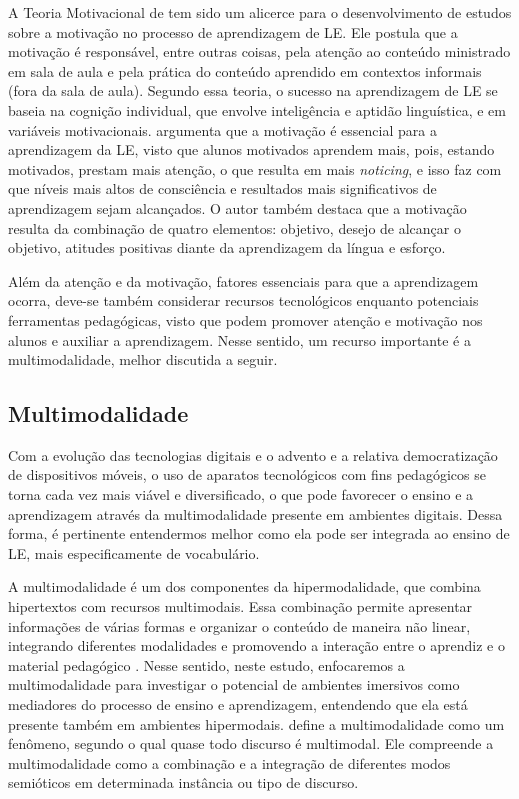 A Teoria Motivacional de \textcite{gardner1979} tem sido um alicerce para o
desenvolvimento de estudos sobre a motivação no processo de aprendizagem
de LE. Ele postula que a motivação é responsável, entre outras coisas,
pela atenção ao conteúdo ministrado em sala de aula e pela prática do
conteúdo aprendido em contextos informais (fora da sala de aula).
Segundo essa teoria, o sucesso na aprendizagem de LE se baseia na
cognição individual, que envolve inteligência e aptidão linguística, e
em variáveis motivacionais. \textcite{gardner2010} argumenta que a motivação é
essencial para a aprendizagem da LE, visto que alunos motivados aprendem
mais, pois, estando motivados, prestam mais atenção, o que resulta em
mais \emph{noticing}, e isso faz com que níveis mais altos de
consciência e resultados mais significativos de aprendizagem sejam
alcançados. O autor também destaca que a motivação resulta da combinação
de quatro elementos: objetivo, desejo de alcançar o objetivo, atitudes
positivas diante da aprendizagem da língua e esforço.

Além da atenção e da motivação, fatores essenciais para que a
aprendizagem ocorra, deve-se também considerar recursos tecnológicos
enquanto potenciais ferramentas pedagógicas, visto que podem promover
atenção e motivação nos alunos e auxiliar a aprendizagem. Nesse sentido,
um recurso importante é a multimodalidade, melhor discutida a seguir.

\subsection{Multimodalidade}\label{sec-multimodalidade}

Com a evolução das tecnologias digitais e o advento e a relativa
democratização de dispositivos móveis, o uso de aparatos tecnológicos
com fins pedagógicos se torna cada vez mais viável e diversificado, o
que pode favorecer o ensino e a aprendizagem através da multimodalidade
presente em ambientes digitais. Dessa forma, é pertinente entendermos
melhor como ela pode ser integrada ao ensino de LE, mais especificamente
de vocabulário.

A multimodalidade é um dos componentes da hipermodalidade, que combina
hipertextos com recursos multimodais. Essa combinação permite apresentar
informações de várias formas e organizar o conteúdo de maneira não
linear, integrando diferentes modalidades e promovendo a interação entre
o aprendiz e o material pedagógico \textcite{braga2004}. Nesse sentido, neste
estudo, enfocaremos a multimodalidade para investigar o potencial de
ambientes imersivos como mediadores do processo de ensino e
aprendizagem, entendendo que ela está presente também em ambientes
hipermodais. \textcite{leeuwen2015} define a multimodalidade como um
fenômeno, segundo o qual quase todo discurso é multimodal. Ele
compreende a multimodalidade como a combinação e a integração de
diferentes modos semióticos em determinada instância ou tipo de
discurso.

